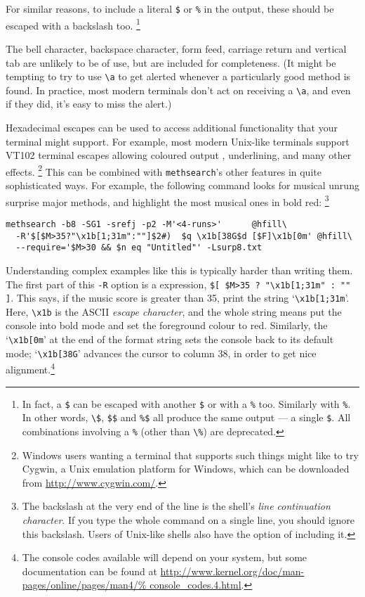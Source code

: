 \documentclass[a4paper,11pt,oneside]{book}
\def\textitidx#1{\textit{#1}\index{#1}}
\def\methsearch{\texttt{meth\-search}}
\begin{document}
For similar reasons, to include a literal \verb+$+ or \verb+%+ in the 
output, these should be escaped with a backslash too.%
\footnote{In fact, a \verb+$+ can be escaped with another \verb+$+ or 
with a \verb+%+ too.  Similarly with \verb+%+.  In other words, \verb+\$+,
\verb+$$+ and \verb+%$+ all produce the same output --- a single \verb+$+.
All combinations involving a \verb+%+ (other than \verb+\%+) are deprecated.}

The bell character, backspace character, 
form feed, carriage return and vertical tab are unlikely to be
of use, but are included for completeness.  (It might be tempting to try to 
use \verb+\a+ to get alerted whenever a particularly good method is found.
In practice, most modern terminals don't act on receiving a \verb+\a+, and
even if they did, it's easy to miss the alert.)

Hexadecimal escapes can be used to access additional functionality that
your terminal might support.  For example, most modern Unix-like terminals
support VT102 terminal escapes allowing coloured output%
, underlining, and many other effects.%
\footnote{Windows users wanting a terminal that supports such things
might like to try Cygwin, a Unix emulation platform for Windows, 
which can be downloaded from \url{http://www.cygwin.com/}.}
This can be combined with \methsearch's other features in quite sophisticated
ways.  For example, the following command looks for musical unrung 
surprise major methods, and highlight the most musical ones in bold red:%
%
\footnote{The backslash at the very end of the line is the shell's 
\textit{line continuation character}.  If you 
type the whole command on a single line, you should ignore this backslash.
Users of Unix-like shells also have the option of including it.}

\begin{Verbatim}[commandchars=@~~]
methsearch -b8 -SG1 -srefj -p2 -M'<4-runs>'      @hfill\
  -R'$[$M>35?"\x1b[1;31m":""]$2#)  $q \x1b[38G$d [$F]\x1b[0m' @hfill\
  --require='$M>30 && $n eq "Untitled"' -Lsurp8.txt
\end{Verbatim}

Understanding complex examples like this is typically harder than
writing them.  The first part of this \verb+-R+ option is a expression,
\verb+$[ $M>35 ? "\x1b[1;31m" : "" ]+.  This says, if the music score 
is greater than 35, print the string `\verb"\x1b[1;31m"'.  Here, \verb+\x1b+
is the ASCII \textitidx{escape character}, and the whole string means
put the console into bold mode and set the 
foreground colour to red.  Similarly, the `\verb"\x1b[0m"'
at the end of the format string sets the console back to its default mode;
`\verb+\x1b[38G+' advances the cursor to column 38, in order to get nice
alignment.\footnote{The console codes\index{console codes} available
will depend on your system, but some 
documentation can be found at
\url{http://www.kernel.org/doc/man-pages/online/pages/man4/%
console_codes.4.html}.}
\end{document}
